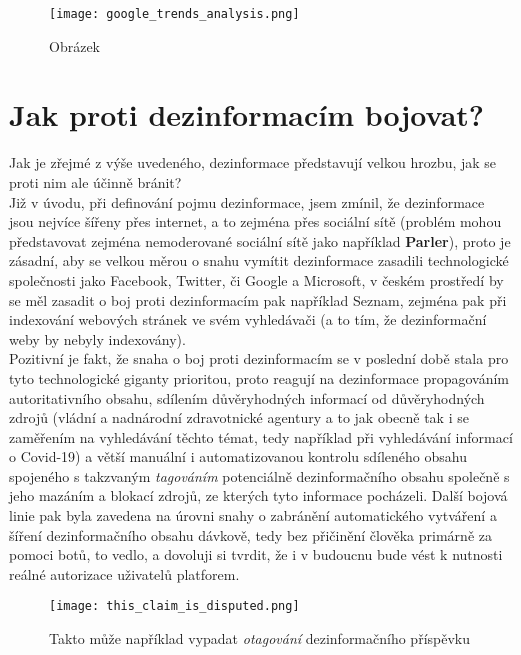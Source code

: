 \begin{figure}[htbp]
  \centering
  \texttt{[image: google\_trends\_analysis.png]}
  \caption{Obrázek}
  \label{fig:google trends}
\end{figure}

\newpage

\section{Jak proti dezinformacím bojovat?}

Jak je zřejmé z výše uvedeného, dezinformace představují velkou hrozbu, jak se proti nim ale účinně bránit?\\

Již v úvodu, při definování pojmu dezinformace, jsem zmínil, že dezinformace jsou nejvíce šířeny přes internet, a to zejména přes sociální sítě (problém mohou představovat zejména nemoderované sociální sítě jako například \textbf{Parler}), proto je zásadní, aby se velkou měrou o snahu vymítit dezinformace zasadili technologické společnosti jako Facebook, Twitter, či Google a Microsoft, v českém prostředí by se měl zasadit o boj proti dezinformacím pak například Seznam, zejména pak při indexování webových stránek ve svém vyhledávači (a to tím, že dezinformační weby by nebyly indexovány).\\

Pozitivní je fakt, že snaha o boj proti dezinformacím se v poslední době stala pro tyto technologické giganty prioritou, proto reagují na dezinformace propagováním autoritativního obsahu, sdílením důvěryhodných informací od důvěryhodných zdrojů (vládní a nadnárodní zdravotnické agentury a to jak obecně tak i se zaměřením na vyhledávání těchto témat, tedy například při vyhledávání informací o Covid-19) a větší manuální i automatizovanou kontrolu sdíleného obsahu spojeného s takzvaným \textit{tagováním} potenciálně dezinformačního obsahu společně s jeho mazáním a blokací zdrojů, ze kterých tyto informace pocházeli. Další bojová linie pak byla zavedena na úrovni snahy o zabránění automatického vytváření a šíření dezinformačního obsahu dávkově, tedy bez přičinění člověka primárně za pomoci botů, to vedlo, a dovoluji si tvrdit, že i v budoucnu bude vést k nutnosti reálné autorizace uživatelů platforem.\\

\begin{figure}[htbp]
  \centering
  \texttt{[image: this\_claim\_is\_disputed.png]}
  \caption{Takto může například vypadat \textit{otagování} dezinformačního příspěvku}
  \label{fig:google trends}
\end{figure}

